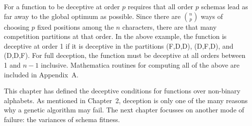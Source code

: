 For a function to be deceptive at order $p$ requires that all order $p$
schemas lead as far away to the global optimum as possible.  Since there
are $n \choose p$ ways of choosing $p$ fixed positions
among the $n$ characters, there are that many competition partitions at
that order.  In the above example, the function is deceptive at order 1 if
it is deceptive in the partitions (F,D,D), (D,F,D), and (D,D,F).
For full deception, the function must be deceptive at all orders between
1 and $n-1$ inclusive.  Mathematica routines for computing all of the
above are included in Appendix~A.

This chapter has defined the deceptive conditions for functions over
non-binary alphabets.  As mentioned in Chapter~2, deception is only one
of the many reasons why a genetic algorithm may fail.  The next chapter
focusses on another mode of failure: the variances of schema fitness.


